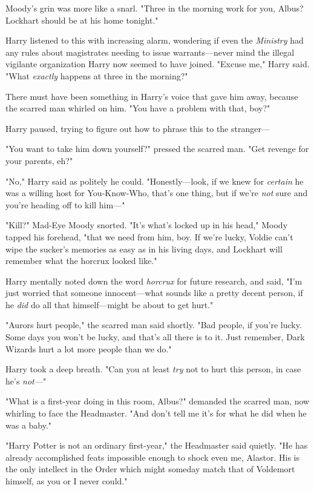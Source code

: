 Moody's grin was more like a snarl. "Three in the morning work for you, Albus? 
Lockhart should be at his home tonight."

Harry listened to this with increasing alarm, wondering if even the 
\emph{Ministry} had any rules about magistrates needing to issue 
warrants---never mind the illegal vigilante organization Harry now seemed to 
have joined. "Excuse me," Harry said. "What \emph{exactly} happens at three in 
the morning?"

There must have been something in Harry's voice that gave him away, because the 
scarred man whirled on him. "You have a problem with that, boy?"

Harry paused, trying to figure out how to phrase this to the stranger---

"You want to take him down yourself?" pressed the scarred man. "Get revenge for 
your parents, eh?"

"No," Harry said as politely he could. "Honestly---look, if we knew for 
\emph{certain} he was a willing host for You-Know-Who, that's one thing, but if 
we're \emph{not} sure and you're heading off to kill him---"

"Kill?" Mad-Eye Moody snorted. "It's what's locked up in his head," Moody 
tapped his forehead, "that we need from him, boy. If we're lucky, Voldie can't 
wipe the sucker's memories as easy as in his living days, and Lockhart will 
remember what the horcrux looked like."

Harry mentally noted down the word \emph{horcrux} for future research, and 
said, "I'm just worried that someone innocent---what sounds like a pretty 
decent person, if he \emph{did} do all that himself---might be about to get 
hurt."

"Aurors hurt people," the scarred man said shortly. "Bad people, if you're 
lucky. Some days you won't be lucky, and that's all there is to it. Just 
remember, Dark Wizards hurt a lot more people than we do."

Harry took a deep breath. "Can you at least \emph{try} not to hurt this person, 
in case he's \emph{not---}"

"What is a first-year doing in this room, Albus?" demanded the scarred man, now 
whirling to face the Headmaster. "And don't tell me it's for what he did when 
he was a baby."

"Harry Potter is not an ordinary first-year," the Headmaster said quietly. "He 
has already accomplished feats impossible enough to shock even me, Alastor. His 
is the only intellect in the Order which might someday match that of Voldemort 
himself, as you or I never could."

